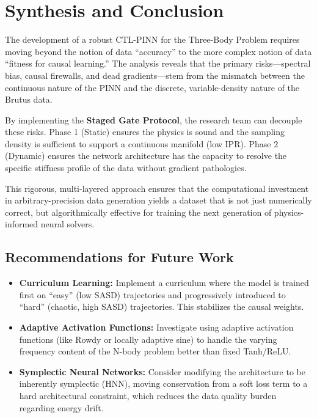 \section{Synthesis and Conclusion}

The development of a robust CTL-PINN for the Three-Body Problem requires moving beyond the notion of data ``accuracy'' to the more complex notion of data ``fitness for causal learning.'' The analysis reveals that the primary risks—spectral bias, causal firewalls, and dead gradients—stem from the mismatch between the continuous nature of the PINN and the discrete, variable-density nature of the Brutus data.

By implementing the \textbf{Staged Gate Protocol}, the research team can decouple these risks. Phase 1 (Static) ensures the physics is sound and the sampling density is sufficient to support a continuous manifold (low IPR). Phase 2 (Dynamic) ensures the network architecture has the capacity to resolve the specific stiffness profile of the data without gradient pathologies.

This rigorous, multi-layered approach ensures that the computational investment in arbitrary-precision data generation yields a dataset that is not just numerically correct, but algorithmically effective for training the next generation of physics-informed neural solvers.

\subsection{Recommendations for Future Work}

\begin{itemize}
    \item \textbf{Curriculum Learning:} Implement a curriculum where the model is trained first on ``easy'' (low SASD) trajectories and progressively introduced to ``hard'' (chaotic, high SASD) trajectories. This stabilizes the causal weights.
    \item \textbf{Adaptive Activation Functions:} Investigate using adaptive activation functions (like Rowdy or locally adaptive sine) to handle the varying frequency content of the N-body problem better than fixed Tanh/ReLU.
    \item \textbf{Symplectic Neural Networks:} Consider modifying the architecture to be inherently symplectic (HNN), moving conservation from a soft loss term to a hard architectural constraint, which reduces the data quality burden regarding energy drift.
\end{itemize}